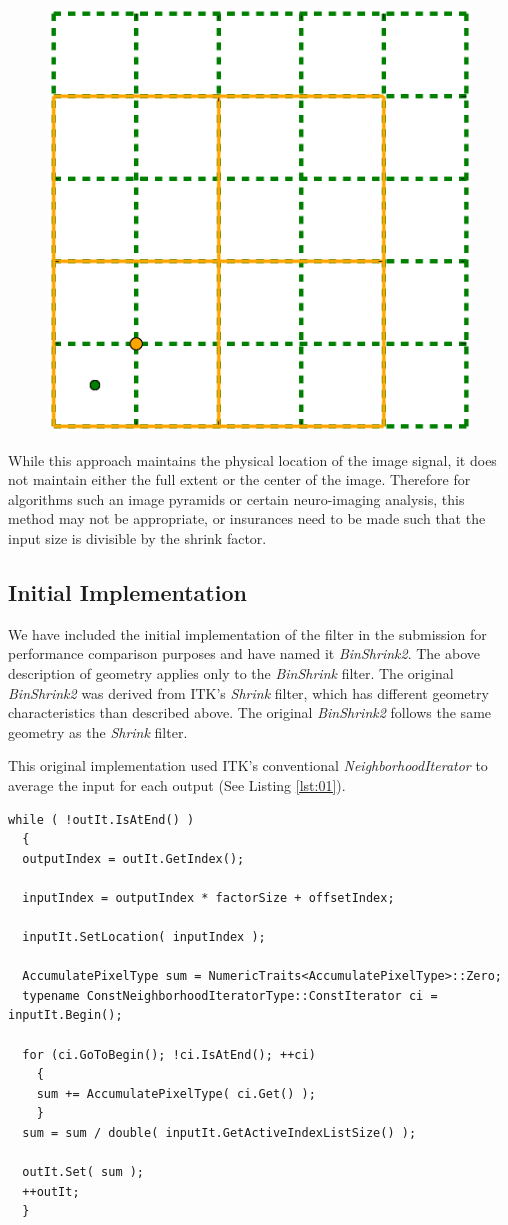 \documentclass{InsightArticle}
\begin{document}
\begin{figure}
  \centering
  \includegraphics[width=0.4\linewidth]{images/pixelgrid}
  \label{fig:PixelGrid}
\end{figure}

While this approach maintains the physical location of the image
signal, it does not maintain either the full extent or the
center of the image. Therefore for algorithms such an image pyramids or certain
neuro-imaging analysis, this method may not be appropriate, or
insurances need to be made such that the input size is divisible by the shrink factor.

\subsection{Initial Implementation}

We have included the initial implementation of the filter in the
submission for performance comparison purposes and have named it
\textit{BinShrink2}. The above description of geometry applies only to the
\textit{BinShrink} filter. The original \textit{BinShrink2} was
derived from ITK's \textit{Shrink} filter, which has different
geometry characteristics than described above. The original \textit{BinShrink2}
follows the same geometry as the \textit{Shrink} filter.

This original implementation used ITK's conventional
\textit{NeighborhoodIterator} to average the input for each output
(See Listing \ref{lst:01}).

\begin{lstlisting}[label=lst:01, caption={A selected section of code
      from \textit{BinShrink2} filter using the neighborhood iterator.}]
while ( !outIt.IsAtEnd() )
  {
  outputIndex = outIt.GetIndex();

  inputIndex = outputIndex * factorSize + offsetIndex;

  inputIt.SetLocation( inputIndex );

  AccumulatePixelType sum = NumericTraits<AccumulatePixelType>::Zero;
  typename ConstNeighborhoodIteratorType::ConstIterator ci = inputIt.Begin();

  for (ci.GoToBegin(); !ci.IsAtEnd(); ++ci)
    {
    sum += AccumulatePixelType( ci.Get() );
    }
  sum = sum / double( inputIt.GetActiveIndexListSize() );

  outIt.Set( sum );
  ++outIt;
  }
\end{lstlisting}
\end{document}
